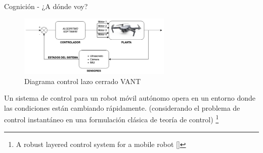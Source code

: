 \documentclass[
  24pt, %
  aspectratio=169, %
]{beamer}
\begin{document}
\begin{frame}{Cognición - ¿A dónde voy?}
  \begin{figure}[h]
    \includegraphics[width=0.65\textwidth]{control_drone.png}
    \caption{Diagrama control lazo cerrado VANT}
  \end{figure}
  \bigskip %
  \small Un sistema de control para un robot móvil autónomo opera en un entorno donde las condiciones están cambiando rápidamente. (considerando el problema de control instantáneo en una formulación clásica de teoría de control) \footnote{A robust layered control system for a mobile robot [\cite{brooks_robot}]}
  
\end{frame}
\end{document}
